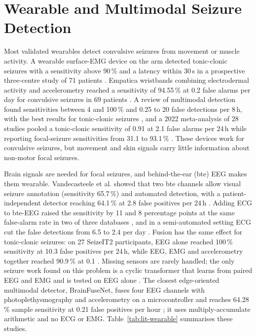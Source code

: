 \section{Wearable and Multimodal Seizure Detection}\label{sec:lit-wearable}

Most validated wearables detect convulsive seizures from movement or muscle activity. A wearable surface-EMG device on
the arm detected tonic-clonic seizures with a sensitivity above 90\,\% and a latency within 30\,s in a prospective
three-centre study of 71 patients \cite{beniczky2018emg}. Empatica wristbands combining electrodermal activity and
accelerometry reached a sensitivity of 94.55\,\% at 0.2 false alarms per day for convulsive seizures in 69 patients
\cite{onorati2017empatica}. A review of multimodal detection found sensitivities between 4 and 100\,\% and 0.25 to 20
false detections per 8\,h, with the best results for tonic-clonic seizures \cite{leijten2018review}, and a 2022
meta-analysis of 28 studies pooled a tonic-clonic sensitivity of 0.91 at 2.1 false alarms per 24\,h while reporting
focal-seizure sensitivities from 31.1 to 93.1\,\% \cite{naganur2022meta}. These devices work for convulsive seizures,
but movement and skin signals carry little information about non-motor focal seizures.

Brain signals are needed for focal seizures, and behind-the-ear (bte) EEG makes them wearable. Vandecasteele et al.
showed that two bte channels allow visual seizure annotation (sensitivity 65.7\,\%) and automated detection, with a
patient-independent detector reaching 64.1\,\% at 2.8 false positives per 24\,h \cite{vandecasteele2020bte}. Adding
ECG to bte-EEG raised the sensitivity by 11 and 8 percentage points at the same false-alarm rate in two of three
databases \cite{vandecasteele2021ecg}, and in a semi-automated setting ECG cut the false detections from 6.5 to 2.4
per day \cite{bhagubai2023ecg}. Fusion has the same effect for tonic-clonic seizures: on 27 SeizeIT2 participants, EEG
alone reached 100\,\% sensitivity at 10.3 false positives per 24\,h, while EEG, EMG and accelerometry together reached
90.9\,\% at 0.1 \cite{zhang2024tcs}. Missing sensors are rarely handled; the only seizure work found on this problem is
a cyclic transformer that learns from paired EEG and EMG and is tested on EEG alone \cite{zhang2024cyclic}. The
closest edge-oriented multimodal detector, BrainFuseNet, fuses four EEG channels with photoplethysmography and
accelerometry on a microcontroller and reaches 64.28\,\% sample sensitivity at 0.21 false positives per hour
\cite{ingolfsson2024brainfusenet}; it uses multiply-accumulate arithmetic and no ECG or EMG. Table~\ref{tab:lit-wearable}
summarises these studies.

